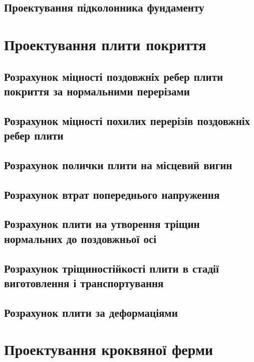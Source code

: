 \documentclass[a4paper,14pt]{article}
\begin{document}
\subsection{Проектування підколонника фундаменту}

\newpage
\section{Проектування плити покриття}
\subsection{Розрахунок міцності поздовжніх ребер плити покриття за нормальними перерізами}
\subsection{Розрахунок міцності похилих перерізів поздовжніх ребер плити}
\subsection{Розрахунок полички плити на місцевий вигин}
\subsection{Розрахунок втрат попереднього напруження}
\subsection{Розрахунок плити на утворення тріщин нормальних до поздовжньої осі}
\subsection{Розрахунок тріщиностійкості плити в стадії виготовлення і транспортування}
\subsection{Розрахунок плити за деформаціями}

\newpage
\section{Проектування кроквяної ферми}
\end{document}
